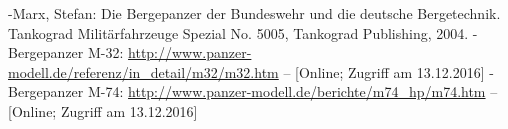 \documentclass[12pt,a4paper]{report}
\begin{document}
\pagebreak

\begin{thebibliography}{999}
\bibitem [Marx] -Marx, Stefan: Die Bergepanzer der Bundeswehr und die deutsche Bergetechnik. Tankograd Militärfahrzeuge Spezial No. 5005, Tankograd Publishing, 2004.
\bibitem [PM] -Bergepanzer M-32: \url{http://www.panzer-modell.de/referenz/in_detail/m32/m32.htm} – [Online; Zugriff am 13.12.2016]
\bibitem [PM] -Bergepanzer M-74: \url{http://www.panzer-modell.de/berichte/m74_hp/m74.htm} – [Online; Zugriff am 13.12.2016]


\end{thebibliography}
\end{document}

